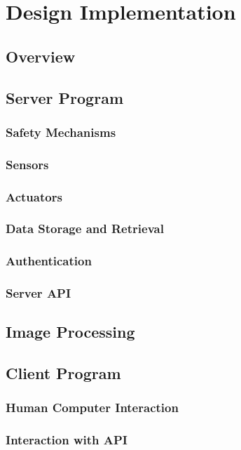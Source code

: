 \chapter{Design Implementation}

\section{Overview}

\section{Server Program}

\subsection{Safety Mechanisms}

\subsection{Sensors}

\subsection{Actuators}

\subsection{Data Storage and Retrieval}

\subsection{Authentication}

\subsection{Server API}

\section{Image Processing}

\section{Client Program}

\subsection{Human Computer Interaction}

\subsection{Interaction with API}









